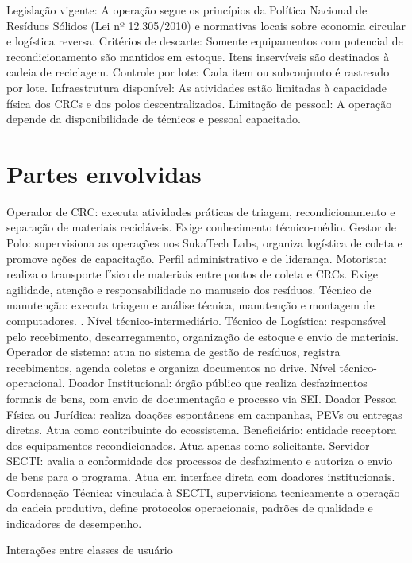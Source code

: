 \documentclass[
	12pt,				%
	openright,			%
	twoside,			%
	a4paper,			%
	english,			%
	french,				%
	spanish,			%
	brazil,				%
	]{abntex2}
\begin{document}
    Legislação vigente: A operação segue os princípios da Política Nacional de Resíduos Sólidos (Lei nº 12.305/2010) e normativas locais sobre economia circular e logística reversa.
    Critérios de descarte: Somente equipamentos com potencial de recondicionamento são mantidos em estoque. Itens inservíveis são destinados à cadeia de reciclagem.
    Controle por lote: Cada item ou subconjunto é rastreado por lote.
    Infraestrutura disponível: As atividades estão limitadas à capacidade física dos CRCs e dos polos descentralizados.
    Limitação de pessoal: A operação depende da disponibilidade de técnicos e pessoal capacitado.

\section{Partes envolvidas}


    Operador de CRC: executa atividades práticas de triagem, recondicionamento e separação de materiais recicláveis. Exige conhecimento técnico-médio.
    Gestor de Polo: supervisiona as operações nos SukaTech Labs, organiza logística de coleta e promove ações de capacitação. Perfil administrativo e de liderança.
    Motorista: realiza o transporte físico de materiais entre pontos de coleta e CRCs. Exige agilidade, atenção e responsabilidade no manuseio dos resíduos.
    Técnico de manutenção: executa triagem e análise técnica, manutenção e montagem de computadores. . Nível técnico-intermediário.
    Técnico de Logística: responsável pelo recebimento, descarregamento, organização de estoque e envio de materiais.
    Operador de sistema: atua no sistema de gestão de resíduos, registra recebimentos, agenda coletas e organiza documentos no drive. Nível técnico-operacional.
    Doador Institucional: órgão público que realiza desfazimentos formais de bens, com envio de documentação e processo via SEI.
    Doador Pessoa Física ou Jurídica: realiza doações espontâneas em campanhas, PEVs ou entregas diretas. Atua como contribuinte do ecossistema.
    Beneficiário: entidade receptora dos equipamentos recondicionados. Atua apenas como solicitante.
    Servidor SECTI: avalia a conformidade dos processos de desfazimento e autoriza o envio de bens para o programa. Atua em interface direta com doadores institucionais.
    Coordenação Técnica: vinculada à SECTI, supervisiona tecnicamente a operação da cadeia produtiva, define protocolos operacionais, padrões de qualidade e indicadores de desempenho.

Interações entre classes de usuário
\end{document}
